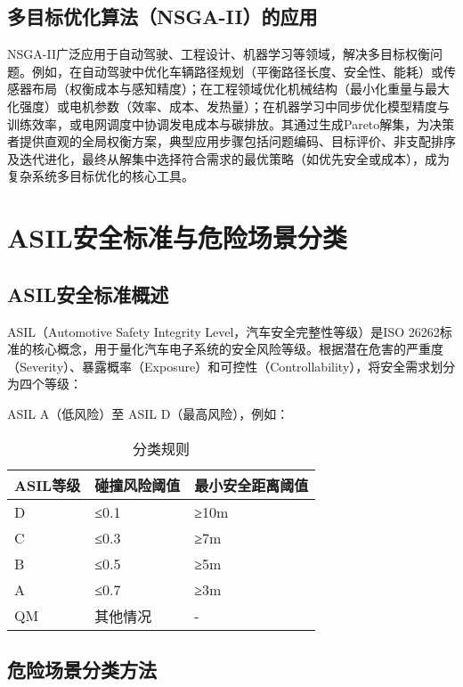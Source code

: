 \subsection{多目标优化算法（NSGA-II）的应用}

NSGA-II广泛应用于自动驾驶、工程设计、机器学习等领域，解决多目标权衡问题。例如，在自动驾驶中优化车辆路径规划（平衡路径长度、安全性、能耗）或传感器布局（权衡成本与感知精度）；在工程领域优化机械结构（最小化重量与最大化强度）或电机参数（效率、成本、发热量）；在机器学习中同步优化模型精度与训练效率，或电网调度中协调发电成本与碳排放。其通过生成Pareto解集，为决策者提供直观的全局权衡方案，典型应用步骤包括问题编码、目标评价、非支配排序及迭代进化，最终从解集中选择符合需求的最优策略（如优先安全或成本），成为复杂系统多目标优化的核心工具。


\section{ASIL安全标准与危险场景分类}

\subsection{ASIL安全标准概述}

ASIL（Automotive Safety Integrity Level，汽车安全完整性等级）是ISO 26262标准的核心概念，用于量化汽车电子系统的安全风险等级。根据潜在危害的严重度（Severity）、暴露概率（Exposure）和可控性（Controllability），将安全需求划分为四个等级：

ASIL A（低风险）至 ASIL D（最高风险），例如：

\begin{table}[htb]
	\centering
	\caption{分类规则}
	\label{T.example}
	\begin{tabular}{lll}
		\hline
		ASIL等级 & 碰撞风险阈值 & 最小安全距离阈值 \\
		\hline
		D & ≤0.1  & ≥10m \\
		\hline
		C & ≤0.3 & ≥7m \\
		\hline
		B & ≤0.5 & ≥5m \\
		\hline
		A & ≤0.7 & ≥3m \\
		\hline
		QM & 其他情况 & - \\
		\hline
	\end{tabular}
\end{table}


\subsection{危险场景分类方法}

